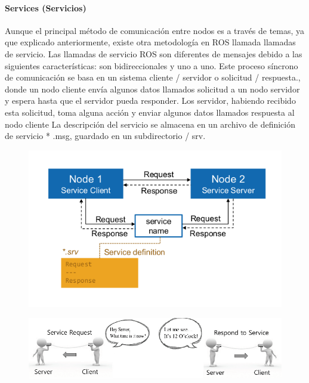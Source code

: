                \newpage


            \paragraph{Services (Servicios)}
                 Aunque el principal método de comunicación entre nodos es a través de temas, ya que explicado anteriormente, existe otra metodología en ROS llamada llamadas de servicio. Las llamadas de servicio ROS son diferentes de mensajes debido a las siguientes características: son bidireccionales y uno a uno. 
                Este proceso síncrono de comunicación se basa en un sistema cliente / servidor o solicitud / respuesta., donde un nodo cliente envía algunos datos llamados solicitud a un nodo servidor y espera hasta que el servidor pueda responder. Los servidor, habiendo recibido esta solicitud, toma alguna acción  y enviar algunos datos llamados respuesta al nodo cliente
                La descripción del servicio se almacena en un archivo de definición de servicio * .msg, guardado en un subdirectorio / srv. 

            \begin{figure}[htb]
                \centering
                \includegraphics[width=1.0\linewidth]{Main/Chapter3/Images3/n_s_a_9.png}
                \caption{}
                \label{f:Cap3_conceptos_9}
            \end{figure} 
            
            \begin{figure}[htb]
                \centering
                \includegraphics[width=1.0\linewidth]{Main/Chapter3/Images3/n_s_a_10.png}
                \caption{}
                \label{f:Cap3_conceptos_10}
            \end{figure}             

